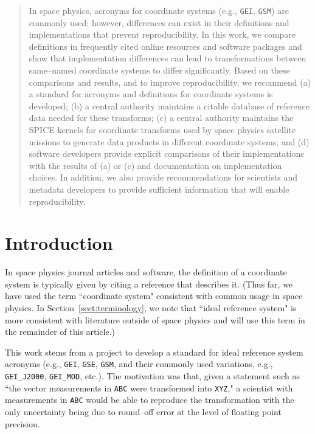 \documentclass[draft]{agujournal2019}
\begin{document}
\begin{abstract}
In space physics, acronyms for coordinate systems (e.g., \texttt{GEI}, \texttt{GSM}) are commonly used; however, differences can exist in their definitions and implementations that prevent reproducibility. In this work, we compare definitions in frequently cited online resources and software packages and show that implementation differences can lead to transformations between same--named coordinate systems to differ significantly. Based on these comparisons and results, and to improve reproducibility, we recommend (a) a standard for acronyms and definitions for coordinate systems is developed; (b) a central authority maintains a citable database of reference data needed for these transforms;  (c) a central authority maintains the SPICE kernels for coordinate transforms used by space physics satellite missions to generate data products in different coordinate systems; and (d) software developers provide explicit comparisons of their implementations with the results of (a) or (c) and documentation on implementation choices. In addition, we also provide recommendations for scientists and metadata developers to provide sufficient information that will enable reproducibility. 
\end{abstract}

\section{Introduction}

In space physics journal articles and software, the definition of a coordinate system is typically given by citing a reference that describes it. (Thus far, we have used the term ``coordinate system" consistent with common usage in space physics. In Section~\ref{sect:terminology}, we note that ``ideal reference system" is more consistent with literature outside of space physics and will use this term in the remainder of this article.)

This work stems from a project to develop a standard for ideal reference system acronyms (e.g., \texttt{GEI}, \texttt{GSE}, \texttt{GSM}, and their commonly used variations, e.g., \texttt{GEI\_J2000}, \texttt{GEI\_MOD}, etc.). The motivation was that, given a statement such as ``the vector measurements in \texttt{ABC} were transformed into \texttt{XYZ}," a scientist with measurements in \texttt{ABC} would be able to reproduce the transformation with the only uncertainty being due to round--off error at the level of floating point precision.
\end{document}
